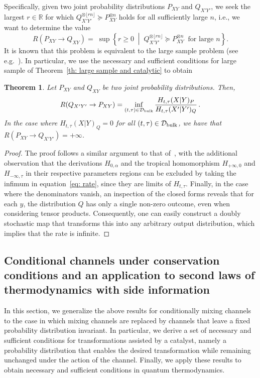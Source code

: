 \documentclass[aps,pra,11pt,onecolumn,nofootinbib,tightenlines]{revtex4-2}
\newtheorem{theorem}{Theorem}[section]
\theoremstyle{definition}
\newcommand{\D}{\mathcal{D}}
\begin{document}
Specifically, given two joint probability distributions $P_{XY}$ and $Q_{X'Y'}$, we seek the largest $r \in \mathbb{R}$ for which $  Q_{X'Y'}^{\otimes \lfloor r n \rfloor} \succeq  P_{XY}^{\otimes n}$ holds for all sufficiently large $n$, i.e., we want to determine the value
\begin{equation}
    R(P_{XY} \rightarrow Q_{XY}) =\; \sup\left\{ r \ge 0 \;\middle|\; Q_{X'Y'}^{\otimes \lfloor r n \rfloor} \succeq  P_{XY}^{\otimes n} \;\; \text{for large } n \right\}.
\end{equation}
It is known that this problem is equivalent to the large sample problem (see e.g.~\cite[Theorem 3.11]{Jensen_Kjaerulf_2019}). In particular, we use the necessary and sufficient conditions for large sample of Theorem~\ref{th: large sample and catalytic} to obtain
\begin{theorem}
\label{thm: rate}
    Let $P_{XY}$ and $Q_{XY}$ be two joint probability distributions. Then, 
    \begin{equation}
    \label{eq: rate}
R(Q_{X'Y'}\rightarrow P_{XY}) = \inf_{(t,\tau) \in \D_{\rm{bulk}}} \frac{H_{t,\tau}(X|Y)_P}{H_{t,\tau}(X'|Y')_Q} \,.
\end{equation}
In the case where $H_{t,\tau}(X|Y)_Q=0$ for all $(t,\tau) \in \D_{\rm{bulk}}$, we have that $R(P_{XY}\rightarrow Q_{X'Y'})=+\infty$. 
\end{theorem}
\begin{proof}
   The proof follows a similar argument to that of~\cite[Theorem 3.11]{Jensen_Kjaerulf_2019}, with the additional observation that the derivations $H_{0,\alpha}$ and the tropical homomorphism $H_{+\infty,0}$ and $H_{-\infty,\tau}$ in their respective parameters regions can be excluded by taking the infimum in equation~\eqref{eq: rate}, since they are limits of $H_{t,\tau}$. Finally, in the case where the denominators vanish, an inspection of the closed forms reveals that for each $y$, the distribution $Q$ has only a single non-zero outcome, even when considering tensor products. Consequently, one can easily construct a doubly stochastic map that transforms this into any arbitrary output distribution, which implies that the rate is infinite.
\end{proof}



\subsection{Conditional channels under conservation conditions and an application to second laws of thermodynamics with side information}
\label{sec: second laws of thermo}
In this section, we generalize the above results for conditionally mixing channels to the case in which mixing channels are replaced by channels that leave a fixed probability distribution invariant. In particular, we derive a set of necessary and sufficient conditions for transformations assisted by a catalyst, namely a probability distribution that enables the desired transformation while remaining unchanged under the action of the channel.
Finally, we apply these results to obtain necessary and sufficient conditions in quantum thermodynamics.
\end{document}
